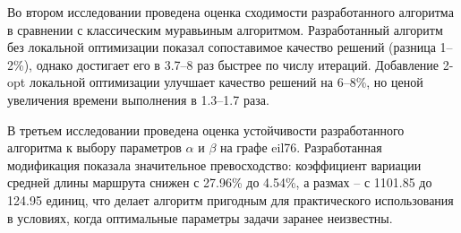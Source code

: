 Во втором исследовании проведена оценка сходимости разработанного алгоритма в сравнении с классическим муравьиным алгоритмом. Разработанный алгоритм без локальной оптимизации показал сопоставимое качество решений (разница 1–2\%), однако достигает его в 3.7–8 раз быстрее по числу итераций. Добавление 2-opt локальной оптимизации улучшает качество решений на 6–8\%, но ценой увеличения времени выполнения в 1.3–1.7 раза.

В третьем исследовании проведена оценка устойчивости разработанного алгоритма к выбору параметров $\alpha$ и $\beta$ на графе eil76. Разработанная модификация показала значительное превосходство: коэффициент вариации средней длины маршрута снижен с 27.96\% до 4.54\%, а размах -- с 1101.85 до 124.95 единиц, что делает алгоритм пригодным для практического использования в условиях, когда оптимальные параметры задачи заранее неизвестны.

\clearpage
